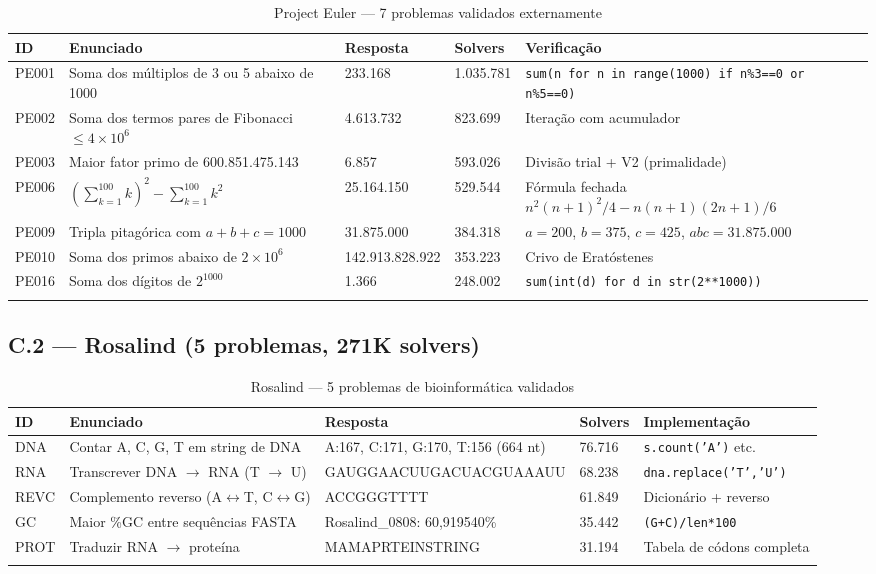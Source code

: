 \documentclass[12pt,a4paper,oneside]{article}
\begin{document}
\begin{longtable}{p{}p{}p{}p{}p{}}
\toprule
\textbf{ID} & \textbf{Enunciado} & \textbf{Resposta} & \textbf{Solvers} & \textbf{Verificação} \\
\midrule
PE001 & Soma dos múltiplos de 3 ou 5 abaixo de 1000 & 233.168 & 1.035.781 & \texttt{sum(n for n in range(1000) if n\%3==0 or n\%5==0)} \\
PE002 & Soma dos termos pares de Fibonacci $\leq 4\times10^6$ & 4.613.732 & 823.699 & Iteração com acumulador \\
PE003 & Maior fator primo de 600.851.475.143 & 6.857 & 593.026 & Divisão trial + V2 (primalidade) \\
PE006 & $(\sum_{k=1}^{100}k)^2-\sum_{k=1}^{100}k^2$ & 25.164.150 & 529.544 & Fórmula fechada $n^2(n+1)^2/4-n(n+1)(2n+1)/6$ \\
PE009 & Tripla pitagórica com $a+b+c=1000$ & 31.875.000 & 384.318 & $a=200$, $b=375$, $c=425$, $abc=31.875.000$ \\
PE010 & Soma dos primos abaixo de $2\times10^6$ & 142.913.828.922 & 353.223 & Crivo de Eratóstenes \\
PE016 & Soma dos dígitos de $2^{1000}$ & 1.366 & 248.002 & \texttt{sum(int(d) for d in str(2**1000))} \\
\bottomrule
\caption{Project Euler — 7 problemas validados externamente}
\end{longtable}

\subsection{C.2 — Rosalind (5 problemas, 271K solvers)}

\begin{longtable}{p{}p{}p{}p{}p{}}
\toprule
\textbf{ID} & \textbf{Enunciado} & \textbf{Resposta} & \textbf{Solvers} & \textbf{Implementação} \\
\midrule
DNA & Contar A, C, G, T em string de DNA & A:167, C:171, G:170, T:156 (664 nt) & 76.716 & \texttt{s.count('A')} etc. \\
RNA & Transcrever DNA $\to$ RNA (T $\to$ U) & GAUGGAACUUGACUACGUAAAUU & 68.238 & \texttt{dna.replace('T','U')} \\
REVC & Complemento reverso (A$\leftrightarrow$T, C$\leftrightarrow$G) & ACCGGGTTTT & 61.849 & Dicionário + reverso \\
GC & Maior \%GC entre sequências FASTA & Rosalind\_0808: 60,919540\% & 35.442 & \texttt{(G+C)/len*100} \\
PROT & Traduzir RNA $\to$ proteína & MAMAPRTEINSTRING & 31.194 & Tabela de códons completa \\
\bottomrule
\caption{Rosalind — 5 problemas de bioinformática validados}
\end{longtable}
\end{document}
